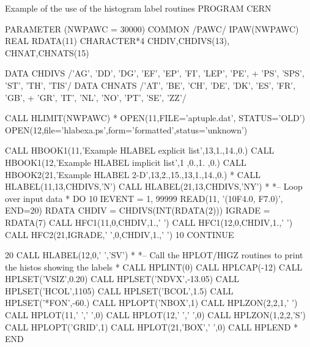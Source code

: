 \begin{XMPt}{Example of the use of the histogram label routines}
\NODOC{\baselineskip.95\baselineskip\relax}      PROGRAM CERN

      PARAMETER (NWPAWC = 30000)
      COMMON /PAWC/ IPAW(NWPAWC)
      REAL        RDATA(11)
      CHARACTER*4 CHDIV,CHDIVS(13), CHNAT,CHNATS(15)

      DATA CHDIVS /'AG', 'DD', 'DG', 'EF', 'EP', 'FI', 'LEP', 'PE',
     +           'PS', 'SPS', 'ST', 'TH', 'TIS'/
      DATA CHNATS /'AT', 'BE', 'CH', 'DE', 'DK', 'ES', 'FR', 'GB',
     +           'GR', 'IT', 'NL', 'NO', 'PT', 'SE', 'ZZ'/

      CALL HLIMIT(NWPAWC)
*
      OPEN(11,FILE='aptuple.dat', STATUS='OLD')
      OPEN(12,file='hlabexa.ps',form='formatted',status='unknown')

      CALL HBOOK1(11,'Example HLABEL explicit list',13,1.,14.,0.)
      CALL HBOOK1(12,'Example HLABEL implicit list',1 ,0.,1. ,0.)
      CALL HBOOK2(21,'Example HLABEL 2-D',13,2.,15.,13,1.,14.,0.)
*
      CALL HLABEL(11,13,CHDIVS,'N')
      CALL HLABEL(21,13,CHDIVS,'NY')
*
*-- Loop over input data
*
      DO 10 IEVENT = 1, 99999
         READ(11, '(10F4.0, F7.0)', END=20) RDATA
         CHDIV    = CHDIVS(INT(RDATA(2)))
         IGRADE   = RDATA(7)
         CALL HFC1(11,0,CHDIV,1.,' ')
         CALL HFC1(12,0,CHDIV,1.,' ')
         CALL HFC2(21,IGRADE,' ',0,CHDIV,1.,' ')
   10 CONTINUE
      
   20 CALL HLABEL(12,0,' ','SV')  
*
*-- Call the HPLOT/HIGZ routines to print the histos showing the labels
*
      CALL HPLINT(0)
      CALL HPLCAP(-12)
      CALL HPLSET('VSIZ',0.20)
      CALL HPLSET('NDVX',-13.05)
      CALL HPLSET('HCOL',1105)
      CALL HPLSET('BCOL',1.5)
      CALL HPLSET('*FON',-60.)
      CALL HPLOPT('NBOX',1)
      CALL HPLZON(2,2,1,' ')
      CALL HPLOT(11,' ',' ',0)
      CALL HPLOT(12,' ',' ',0)
      CALL HPLZON(1,2,2,'S')  
      CALL HPLOPT('GRID',1)
      CALL HPLOT(21,'BOX',' ',0)
      CALL HPLEND
*
      END
\end{XMPt}

